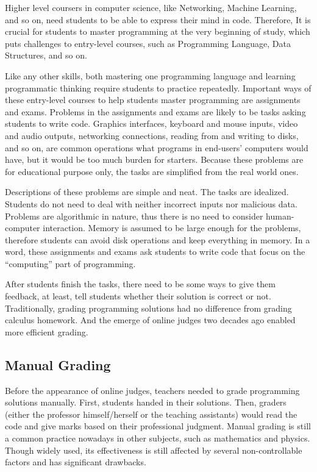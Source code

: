         Higher level coursers in computer science, like Networking, Machine Learning, and so on,
        need students to be able to express their mind in code.
        Therefore, It is crucial for students to master programming at the very beginning of study,
        which puts challenges to entry-level courses, such as Programming Language, Data Structures, and so on.

        Like any other skills, both mastering one programming language and learning programmatic thinking
        require students to practice repeatedly.
        Important ways of these entry-level courses to help students master programming are assignments and exams.
        Problems in the assignments and exams are likely to be tasks asking students to write code.
        Graphics interfaces, keyboard and mouse inputs, video and audio outputs, networking connections,
        reading from and writing to disks, and so on, are common operations what programs in end-users' computers would have,
        but it would be too much burden for starters.
        Because these problems are for educational purpose only, the tasks are simplified from the real world ones.

        Descriptions of these problems are simple and neat. The tasks are idealized.
        Students do not need to deal with neither incorrect inputs nor malicious data.
        Problems are algorithmic in nature, thus there is no need to consider human-computer interaction.
        Memory is assumed to be large enough for the problems, therefore students can avoid disk operations
        and keep everything in memory.
        In a word, these assignments and exams ask students to write code that focus on the ``computing'' part of programming.

        After students finish the tasks, there need to be some ways to give them feedback, at least,
        tell students whether their solution is correct or not.
        Traditionally, grading programming solutions had no difference from grading calculus homework.
        And the emerge of online judges two decades ago enabled more efficient grading.
        
    \subsection{Manual Grading}

        Before the appearance of online judges, teachers needed to grade programming solutions manually.
        First, students handed in their solutions.
        Then, graders (either the professor himself/herself or the teaching assistants)
        would read the code and give marks based on their professional judgment.
        Manual grading is still a common practice nowadays in other subjects, such as mathematics and physics.
        Though widely used, its effectiveness is still affected by several non-controllable factors
        and has significant drawbacks. \cite{Kurnia2001}


